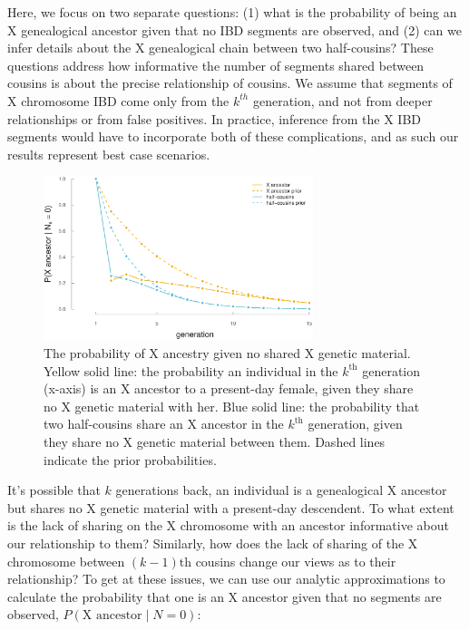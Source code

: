 \documentclass[11pt]{article}
\begin{document}
Here, we focus on two separate questions: (1) what is the probability of being
an X genealogical ancestor given that no IBD segments are observed, and (2) can
we infer details about the X genealogical chain between two half-cousins?
These questions address how informative the number of segments shared between
cousins is about the precise relationship of cousins. We assume that segments
of X chromosome IBD come only from the $k^{th}$ generation, and not from deeper
relationships or from false positives. In practice, inference from the X IBD
segments would have to incorporate both of these complications, and as such our
results represent best case scenarios.

\begin{figure}[!ht]
  \centering
  \includegraphics[width=0.7\textwidth]{images/prob-xanc-n0.eps}

  \caption{The probability of X ancestry given no shared X genetic material.
Yellow solid line: the probability an individual in the $k^\text{th}$
generation (x-axis) is an X ancestor to a present-day female, given they share
no X genetic material with her. Blue solid line: the probability that two
half-cousins share an X ancestor in the $k^\text{th}$ generation, given they
share no X genetic material between them. Dashed lines indicate the prior
probabilities.}

  \label{fig:prob-xanc-n0}
\end{figure}


It's possible that $k$ generations back, an individual is a genealogical X
ancestor but shares no X genetic material with a present-day descendent. To
what extent is the lack of sharing on the X chromosome with an ancestor
informative about our relationship to them? Similarly, how does the lack of
sharing of the X chromosome between $(k-1)\text{th}$ cousins change our views
as to their relationship?  To get at these issues, we can use our analytic
approximations to calculate the probability that one is an X ancestor given
that no segments are observed, $P(\text{X ancestor} \;|\; N = 0)$:
\end{document}
